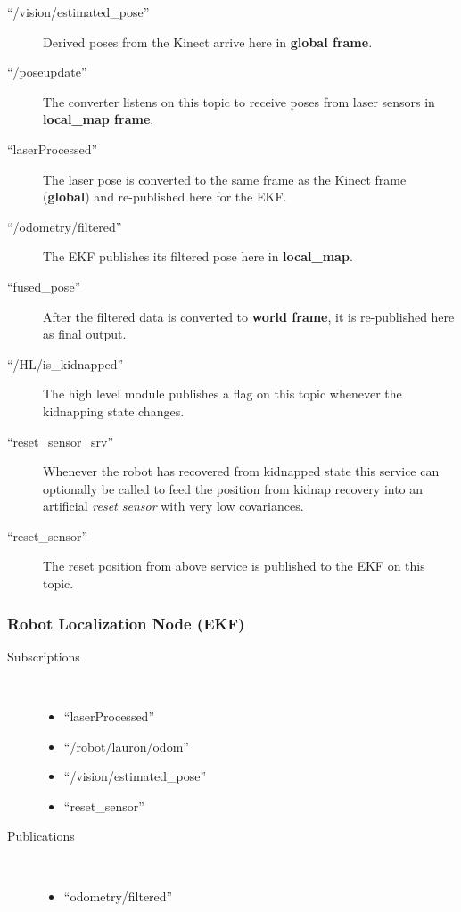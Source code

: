 \begin{description}
\item[``/vision/estimated\_pose''] Derived poses from the Kinect arrive here in \textbf{global frame}.
\item[``/poseupdate''] The converter listens on this topic to receive poses from laser sensors in \textbf{local\_map frame}. 
\item[``laserProcessed''] The laser pose is converted to the same frame as the Kinect frame (\textbf{global}) and re-published here for the EKF.
\item[``/odometry/filtered''] The EKF publishes its filtered pose here in \textbf{local\_map}.
\item[``fused\_pose''] After the filtered data is converted to \textbf{world frame}, it is re-published here as final output.
\item[``/HL/is\_kidnapped''] The high level module publishes a flag on this topic whenever the kidnapping state changes.
\item[``reset\_sensor\_srv''] Whenever the robot has recovered from kidnapped state this service can optionally be called to feed the position from kidnap recovery  into an artificial \textit{reset sensor} with very low covariances.
\item[``reset\_sensor''] The reset position from above service is published to the EKF on this topic.
\end{description}

\subsubsection{Robot Localization Node (EKF)}
\begin{description}
\item[Subscriptions]\
\begin{itemize}
	\item ``laserProcessed''
	\item``/robot/lauron/odom''
	\item ``/vision/estimated\_pose''
	 \item ``reset\_sensor'' 
\end{itemize}
	
\item[Publications]\
	\begin{itemize}
	\item ``odometry/filtered''
	\end{itemize}
\end{description}

